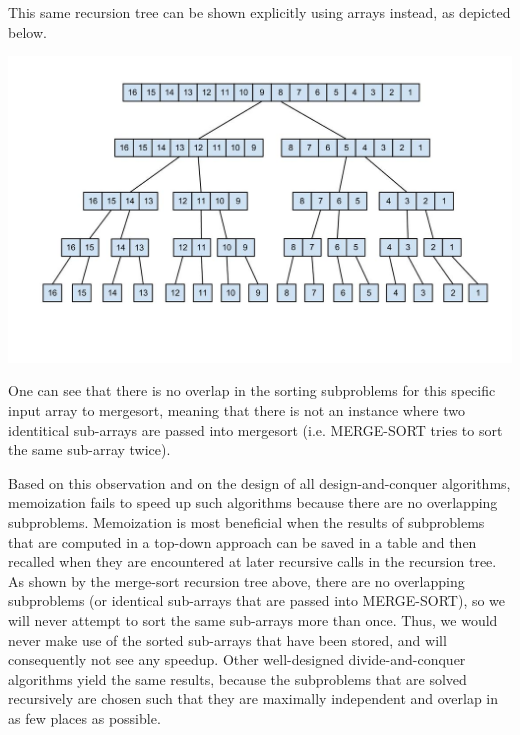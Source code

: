 \documentclass[11pt]{article}
\begin{document}
\begin{sol}
This same recursion tree can be shown explicitly using arrays instead, as depicted below.

\begin{center}
	\includegraphics[width=150mm]{msort16.jpg}
\end{center}

One can see that there is no overlap in the sorting subproblems for this specific input array to mergesort, meaning that there is not an instance where two identitical sub-arrays are passed into mergesort (i.e. MERGE-SORT tries to sort the same sub-array twice). 

Based on this observation and on the design of all design-and-conquer algorithms, memoization fails to speed up such algorithms because there are no overlapping subproblems. Memoization is most beneficial when the results of subproblems that are computed in a top-down approach can be saved in a table and then recalled when they are encountered at later recursive calls in the recursion tree. As shown by the merge-sort recursion tree above, there are no overlapping subproblems (or identical sub-arrays that are passed into MERGE-SORT), so we will never attempt to sort the same sub-arrays more than once. Thus, we would never make use of the sorted sub-arrays that have been stored, and will consequently not see any speedup. Other well-designed divide-and-conquer algorithms yield the same results, because the subproblems that are solved recursively are chosen such that they are maximally independent and overlap in as few places as possible. 
\end{sol}
\end{document}
